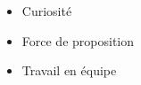 %
%
%

\twocolumnsection
{
\begin{skills}
\end{skills}}
{
\vspace{1em}
\begin{itemize}
	\item Curiosité
	\item Force de proposition                    
    \item Travail en équipe 
\end{itemize}
}

